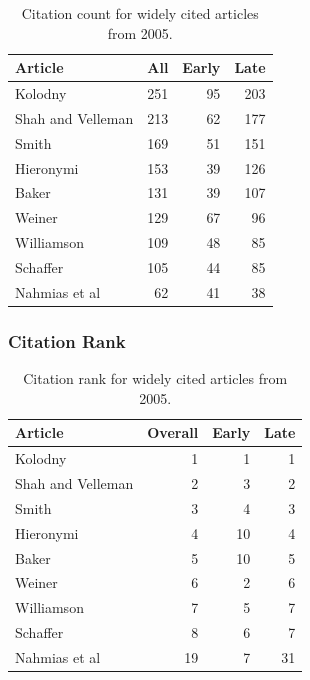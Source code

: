 \documentclass[
  10pt,
  letterpaper,
  DIV=11,
  numbers=noendperiod,
  twoside]{scrartcl}
\begin{document}
\begin{longtable}[]{@{}lrrr@{}}

\caption{\label{tbl-citation-count-2005}Citation count for widely cited
articles from 2005.}

\tabularnewline

\toprule\noalign{}
Article & All & Early & Late \\
\midrule\noalign{}
\endhead
\bottomrule\noalign{}
\endlastfoot
Kolodny & 251 & 95 & 203 \\
Shah and Velleman & 213 & 62 & 177 \\
Smith & 169 & 51 & 151 \\
Hieronymi & 153 & 39 & 126 \\
Baker & 131 & 39 & 107 \\
Weiner & 129 & 67 & 96 \\
Williamson & 109 & 48 & 85 \\
Schaffer & 105 & 44 & 85 \\
Nahmias et al & 62 & 41 & 38 \\

\end{longtable}

\subsubsection*{Citation Rank}\label{citation-rank-29}

\begin{longtable}[]{@{}lrrr@{}}

\caption{\label{tbl-citation-rank-2005}Citation rank for widely cited
articles from 2005.}

\tabularnewline

\toprule\noalign{}
Article & Overall & Early & Late \\
\midrule\noalign{}
\endhead
\bottomrule\noalign{}
\endlastfoot
Kolodny & 1 & 1 & 1 \\
Shah and Velleman & 2 & 3 & 2 \\
Smith & 3 & 4 & 3 \\
Hieronymi & 4 & 10 & 4 \\
Baker & 5 & 10 & 5 \\
Weiner & 6 & 2 & 6 \\
Williamson & 7 & 5 & 7 \\
Schaffer & 8 & 6 & 7 \\
Nahmias et al & 19 & 7 & 31 \\

\end{longtable}
\end{document}
